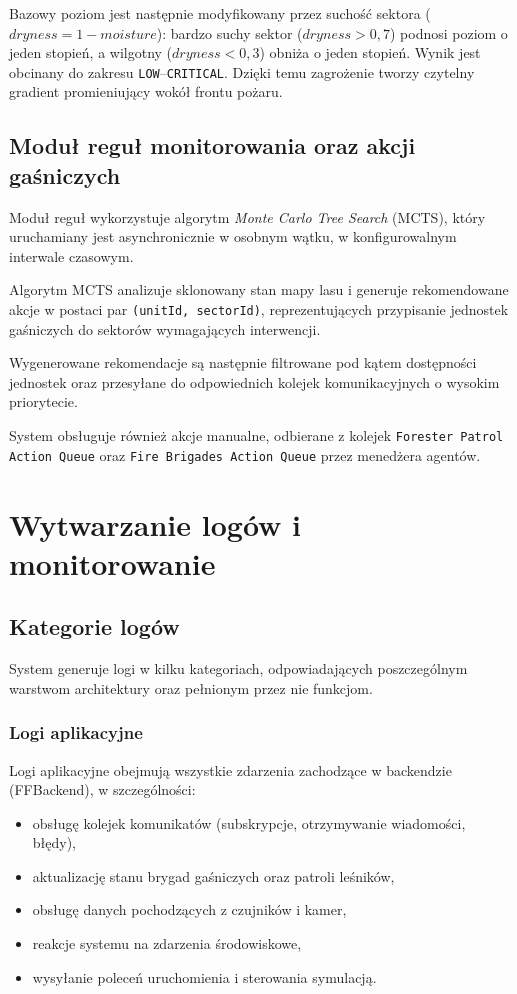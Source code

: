 \documentclass[11pt,a4paper]{article}
\begin{document}
Bazowy poziom jest następnie modyfikowany przez suchość sektora ($\mathit{dryness} = 1 - \mathit{moisture}$): bardzo suchy sektor ($\mathit{dryness} > 0{,}7$) podnosi poziom o jeden stopień, a wilgotny ($\mathit{dryness} < 0{,}3$) obniża o jeden stopień. Wynik jest obcinany do zakresu \texttt{LOW}--\texttt{CRITICAL}. Dzięki temu zagrożenie tworzy czytelny gradient promieniujący wokół frontu pożaru.

\subsection{Moduł reguł monitorowania oraz akcji gaśniczych}

Moduł reguł wykorzystuje algorytm \textit{Monte Carlo Tree Search} (MCTS), który uruchamiany jest asynchronicznie w osobnym wątku, w konfigurowalnym interwale czasowym.

Algorytm MCTS analizuje sklonowany stan mapy lasu i generuje rekomendowane akcje w postaci par \texttt{(unitId, sectorId)}, reprezentujących przypisanie jednostek gaśniczych do sektorów wymagających interwencji.

Wygenerowane rekomendacje są następnie filtrowane pod kątem dostępności jednostek oraz przesyłane do odpowiednich kolejek komunikacyjnych o wysokim priorytecie.

System obsługuje również akcje manualne, odbierane z kolejek \texttt{Forester Patrol Action Queue} oraz \texttt{Fire Brigades Action Queue} przez menedżera agentów.

\section{Wytwarzanie logów i monitorowanie}

\subsection{Kategorie logów}

System generuje logi w kilku kategoriach, odpowiadających poszczególnym warstwom architektury oraz pełnionym przez nie funkcjom.

\subsubsection*{Logi aplikacyjne}

Logi aplikacyjne obejmują wszystkie zdarzenia zachodzące w backendzie (FFBackend), w szczególności:
\begin{itemize}
    \item obsługę kolejek komunikatów (subskrypcje, otrzymywanie wiadomości, błędy),
    \item aktualizację stanu brygad gaśniczych oraz patroli leśników,
    \item obsługę danych pochodzących z czujników i kamer,
    \item reakcje systemu na zdarzenia środowiskowe,
    \item wysyłanie poleceń uruchomienia i sterowania symulacją.
\end{itemize}
\end{document}
